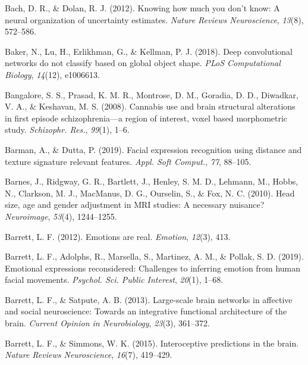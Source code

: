 \documentclass[11pt,american,a4paper,oneside,]{memoir} %
\begin{document}
\leavevmode\hypertarget{ref-bach2012knowing}{}%
Bach, D. R., \& Dolan, R. J. (2012). Knowing how much you don't know: A neural organization of uncertainty estimates. \emph{Nature Reviews Neuroscience}, \emph{13}(8), 572--586.

\leavevmode\hypertarget{ref-baker2018deep}{}%
Baker, N., Lu, H., Erlikhman, G., \& Kellman, P. J. (2018). Deep convolutional networks do not classify based on global object shape. \emph{PLoS Computational Biology}, \emph{14}(12), e1006613.

\leavevmode\hypertarget{ref-Bangalore2008-kc}{}%
Bangalore, S. S., Prasad, K. M. R., Montrose, D. M., Goradia, D. D., Diwadkar, V. A., \& Keshavan, M. S. (2008). Cannabis use and brain structural alterations in first episode schizophrenia---a region of interest, voxel based morphometric study. \emph{Schizophr. Res.}, \emph{99}(1), 1--6.

\leavevmode\hypertarget{ref-Barman2019-af}{}%
Barman, A., \& Dutta, P. (2019). Facial expression recognition using distance and texture signature relevant features. \emph{Appl. Soft Comput.}, \emph{77}, 88--105.

\leavevmode\hypertarget{ref-Barnes2010-pu}{}%
Barnes, J., Ridgway, G. R., Bartlett, J., Henley, S. M. D., Lehmann, M., Hobbs, N., Clarkson, M. J., MacManus, D. G., Ourselin, S., \& Fox, N. C. (2010). Head size, age and gender adjustment in MRI studies: A necessary nuisance? \emph{Neuroimage}, \emph{53}(4), 1244--1255.

\leavevmode\hypertarget{ref-barrett2012emotions}{}%
Barrett, L. F. (2012). Emotions are real. \emph{Emotion}, \emph{12}(3), 413.

\leavevmode\hypertarget{ref-Barrett2019-bc}{}%
Barrett, L. F., Adolphs, R., Marsella, S., Martinez, A. M., \& Pollak, S. D. (2019). Emotional expressions reconsidered: Challenges to inferring emotion from human facial movements. \emph{Psychol. Sci. Public Interest}, \emph{20}(1), 1--68.

\leavevmode\hypertarget{ref-barrett2013large}{}%
Barrett, L. F., \& Satpute, A. B. (2013). Large-scale brain networks in affective and social neuroscience: Towards an integrative functional architecture of the brain. \emph{Current Opinion in Neurobiology}, \emph{23}(3), 361--372.

\leavevmode\hypertarget{ref-barrett2015interoceptive}{}%
Barrett, L. F., \& Simmons, W. K. (2015). Interoceptive predictions in the brain. \emph{Nature Reviews Neuroscience}, \emph{16}(7), 419--429.
\end{document}
